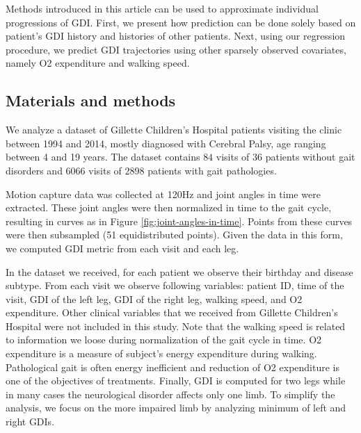 \documentclass[preprint]{imsart}
\numberwithin{equation}{section}
\theoremstyle{plain}
\begin{document}

Methods introduced in this article can be used to approximate individual progressions of GDI. First, we present how prediction can be done solely based on patient's GDI history and histories of other patients. Next, using our regression procedure, we predict GDI trajectories using other sparsely observed covariates, namely O2 expenditure and walking speed.

\subsection{Materials and methods}

We analyze a dataset of Gillette Children's Hospital patients visiting the clinic between 1994 and 2014, mostly diagnosed with Cerebral Palsy, age ranging between 4 and 19 years. The dataset contains $84$ visits of $36$ patients without gait disorders and $6066$ visits of $2898$ patients with gait pathologies.

Motion capture data was collected at 120Hz and joint angles in time were extracted. These joint angles were then normalized in time to the gait cycle, resulting in curves as in Figure \ref{fig:joint-angles-in-time}. Points from these curves were then subsampled (51 equidistributed points). Given the data in this form, we computed GDI metric from each visit and each leg.

In the dataset we received, for each patient we observe their birthday and disease subtype. From each visit we observe following variables: patient ID, time of the visit, GDI of the left leg, GDI of the right leg, walking speed, and O2 expenditure. Other clinical variables that we received from Gillette Children's Hospital were not included in this study. Note that the walking speed is related to information we loose during normalization of the gait cycle in time. O2 expenditure is a measure of subject's energy expenditure during walking. Pathological gait is often energy inefficient and reduction of O2 expenditure is one of the objectives of treatments. Finally, GDI is computed for two legs while in many cases the neurological disorder affects only one limb. To simplify the analysis, we focus on the more impaired limb by analyzing minimum of left and right GDIs.
\end{document}
